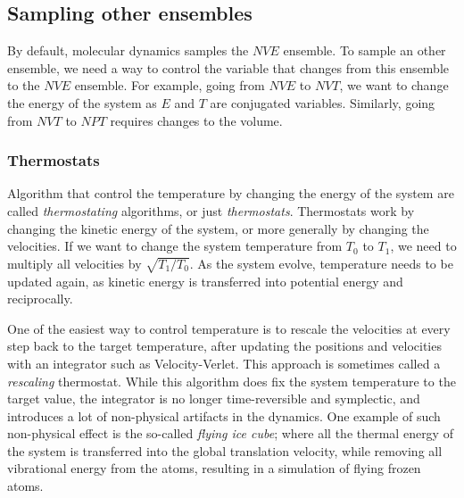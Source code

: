 \documentclass[thesis]{subfiles}
\begin{document}
\subsection{Sampling other ensembles}

By default, molecular dynamics samples the $NVE$ ensemble. To sample an other
ensemble, we need a way to control the variable that changes from this ensemble
to the $NVE$ ensemble. For example, going from $NVE$ to $NVT$, we want to
change the energy of the system as $E$ and $T$ are conjugated variables.
Similarly, going from $NVT$ to $NPT$ requires changes to the volume.

\subsubsection{Thermostats}

Algorithm that control the temperature by changing the energy of the system are
called \emph{thermostating} algorithms, or just \emph{thermostats}. Thermostats
work by changing the kinetic energy of the system, or more generally by changing
the velocities. If we want to change the system temperature from $T_0$ to $T_1$,
we need to multiply all velocities by $\sqrt{T_1 / T_0}$. As the system evolve,
temperature needs to be updated again, as kinetic energy is transferred into
potential energy and reciprocally.

One of the easiest way to control temperature is to rescale the velocities at
every step back to the target temperature, after updating the positions and
velocities with an integrator such as Velocity-Verlet. This approach is
sometimes called a \emph{rescaling} thermostat. While this algorithm does fix
the system temperature to the target value, the integrator is no longer
time-reversible and symplectic, and introduces a lot of non-physical artifacts
in the dynamics. One example of such non-physical effect is the so-called
\emph{flying ice cube}; where all the thermal energy of the system is
transferred into the global translation velocity, while removing all vibrational
energy from the atoms, resulting in a simulation of flying frozen atoms.
\end{document}
